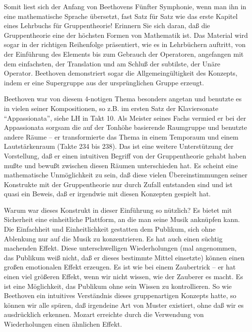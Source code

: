 Somit liest sich der Anfang von Beethovens Fünfter Symphonie, wenn man ihn in eine mathematische Sprache übersetzt, fast Satz für Satz wie das erste Kapitel eines Lehrbuchs für Gruppentheorie!
Erinnern Sie sich daran, daß die Gruppentheorie eine der höchsten Formen von Mathematik ist.
Das Material wird sogar in der richtigen Reihenfolge präsentiert, wie es in Lehrbüchern auftritt, von der Einführung des Elements bis zum Gebrauch der Operatoren, angefangen mit dem einfachsten, der Translation und am Schluß der subtilste, der Unäre Operator.
Beethoven demonstriert sogar die Allgemeingültigkeit des Konzepts, indem er eine Supergruppe aus der ursprünglichen Gruppe erzeugt.

Beethoven war von diesem 4-notigen Thema besonders angetan und benutzte es in vielen seiner Kompositionen, so z.B. im ersten Satz der Klaviersonate \enquote{Appassionata}, siehe LH in Takt 10.
Als Meister seines Fachs vermied er bei der Appassionata sorgsam die auf der Tonhöhe basierende Raumgruppe und benutzte andere Räume -- er transformierte das Thema in einem Temporaum und einem Lautstärkenraum (Takte 234 bis 238).
Das ist eine weitere Unterstützung der Vorstellung, daß er einen intuitiven Begriff von der Gruppentheorie gehabt haben mußte und bewußt zwischen diesen Räumen unterschieden hat.
Es scheint eine mathematische Unmöglichkeit zu sein, daß diese vielen Übereinstimmungen seiner Konstrukte mit der Gruppentheorie nur durch Zufall entstanden sind und ist quasi ein Beweis, daß er irgendwie mit diesen Konzepten gespielt hat.

Warum war dieses Konstrukt in dieser Einführung so nützlich?
Es bietet mit Sicherheit eine einheitliche Plattform, an die man seine Musik anknüpfen kann.
Die Einfachheit und Einheitlichkeit gestatten dem Publikum, sich ohne Ablenkung nur auf die Musik zu konzentrieren.
Es hat auch einen süchtig machenden Effekt.
Diese unterschwelligen Wiederholungen (mal angenommen, das Publikum weiß nicht, daß er dieses bestimmte Mittel einsetzte) können einen großen emotionalen Effekt erzeugen.
Es ist wie bei einem Zaubertrick -- er hat einen viel größeren Effekt, wenn wir nicht wissen, wie der Zauberer es macht.
Es ist eine Möglichkeit, das Publikum ohne sein Wissen zu kontrollieren.
So wie Beethoven ein intuitives Verständnis dieses gruppenartigen Konzepts hatte, so können wir alle spüren, daß irgendeine Art von Muster existiert, ohne daß wir es ausdrücklich erkennen.
Mozart erreichte durch die Verwendung von Wiederholungen einen ähnlichen Effekt.

